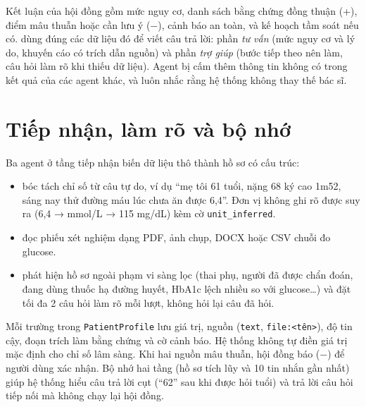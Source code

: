 Kết luận của hội đồng gồm mức nguy cơ, danh sách bằng chứng đồng thuận (+), điểm mâu thuẫn hoặc cần lưu ý (−), cảnh báo an toàn, và kế hoạch tầm soát nếu có.  dùng đúng các dữ liệu đó để viết câu trả lời: phần \emph{tư vấn} (mức nguy cơ và lý do, khuyến cáo có trích dẫn nguồn) và phần \emph{trợ giúp} (bước tiếp theo nên làm, câu hỏi làm rõ khi thiếu dữ liệu). Agent bị cấm thêm thông tin không có trong kết quả của các agent khác, và luôn nhắc rằng hệ thống không thay thế bác sĩ.

\section{Tiếp nhận, làm rõ và bộ nhớ}

Ba agent ở tầng tiếp nhận biến dữ liệu thô thành hồ sơ có cấu trúc:
\begin{itemize}
  \item {} bóc tách chỉ số từ câu tự do, ví dụ ``mẹ tôi 61 tuổi, nặng 68 ký cao 1m52, sáng nay thử đường máu lúc chưa ăn được 6,4''. Đơn vị không ghi rõ được suy ra (6,4 → mmol/L → 115 mg/dL) kèm cờ \texttt{unit\_inferred}.
  \item {} đọc phiếu xét nghiệm dạng PDF, ảnh chụp, DOCX hoặc CSV chuỗi đo glucose.
  \item {} phát hiện hồ sơ ngoài phạm vi sàng lọc (thai phụ, người đã được chẩn đoán, đang dùng thuốc hạ đường huyết, HbA1c lệch nhiều so với glucose\ldots) và đặt tối đa 2 câu hỏi làm rõ mỗi lượt, không hỏi lại câu đã hỏi.
\end{itemize}
Mỗi trường trong \texttt{PatientProfile} lưu giá trị, nguồn (\texttt{text}, \texttt{file:<tên>}), độ tin cậy, đoạn trích làm bằng chứng và cờ cảnh báo. Hệ thống không tự điền giá trị mặc định cho chỉ số lâm sàng. Khi hai nguồn mâu thuẫn, hội đồng báo (−) để người dùng xác nhận. Bộ nhớ hai tầng (hồ sơ tích lũy và 10 tin nhắn gần nhất) giúp hệ thống hiểu câu trả lời cụt (``62'' sau khi được hỏi tuổi) và trả lời câu hỏi tiếp nối mà không chạy lại hội đồng.

